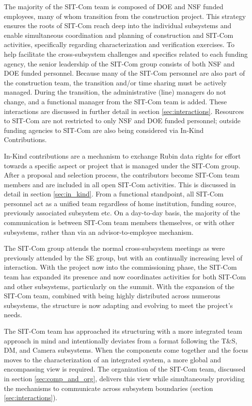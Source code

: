 \documentclass[SE,lsstdraft,authoryear,toc]{lsstdoc}
\begin{document}
The majority of the SIT-Com team is composed of DOE and NSF funded employees, many of whom transition from the construction project.
This strategy ensures the roots of SIT-Com reach deep into the individual subsystems and enable simultaneous coordination and planning of construction and SIT-Com activities, specifically regarding characterization and verification exercises.
To help facilitate the cross-subsystem challenges and specifics related to each funding agency, the senior leadership of the SIT-Com group consists of both NSF and DOE funded personnel.
Because many of the SIT-Com personnel are also part of the construction team, the transition and/or time sharing must be actively managed.
During the transition, the administrative (line) managers do not change, and a functional manager from the SIT-Com team is added.
These interactions are discussed in further detail in section \ref{sec:interactions}.
Resources to SIT-Com are not restricted to only NSF and DOE funded personnel; outside funding agencies to SIT-Com are also being considered via In-Kind Contributions.

 In-Kind contributions are a mechanism to exchange Rubin data rights for effort towards a specific aspect or project that is managed under the SIT-Com group.
After a proposal and selection process, the contributors become SIT-Com team members and are included in all open SIT-Com activities.
This is discussed in detail in section \ref{sec:in_kind}.
From a functional standpoint, all SIT-Com personnel act as a unified team regardless of home institution, funding source, previously associated subsystem etc.
On a day-to-day basis, the majority of the communication is between SIT-Com team members themselves, or with other subsystems, rather than via an advisor-to-employee mechanism.

The SIT-Com group attends the normal cross-subsystem meetings as were previously attended by the SE group, but with an continually increasing level of interaction.
With the project now into the commissioning phase, the SIT-Com team has expanded its presence and now coordinates activities for both SIT-Com and other subsystems, particularly on the summit.
With the expansion of the SIT-Com team, combined with being highly distributed across numerous subsystems, the structure is now adapting and evolving to meet the project's needs.

The SIT-Com team has approached its structuring with a more integrated team approach in mind and intentionally deviates from a format following the T\&S, DM, and Camera subsystems.
When the components come together and the focus moves to the characterization of an integrated system, a more global and encompassing view is required.
The organization of the SIT-Com team, discussed in section \ref{sec:comp_and_org}, delivers this view while simultaneously providing the mechanisms to communicate across subsystem boundaries (section \ref{sec:interactions}).
\end{document}
